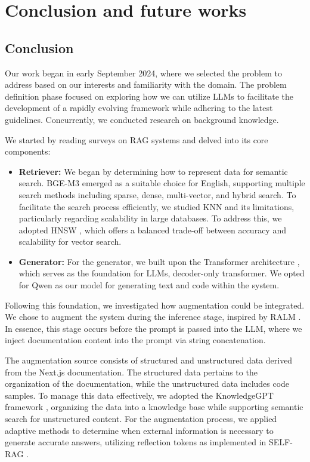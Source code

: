 \chapter{Conclusion and future works}

\section{Conclusion}

Our work began in early September 2024, where we selected the problem to address based on our interests and familiarity with the domain. The problem definition phase focused on exploring how we can utilize LLMs to facilitate the development of a rapidly evolving framework while adhering to the latest guidelines. Concurrently, we conducted research on background knowledge. 

We started by reading surveys on RAG systems \cite{zhao2024retrievalaugmentedgenerationaigeneratedcontent, gao2023ragllmsurvey} and delved into its core components:

\begin{itemize}
	\item \textbf{Retriever:} 
	We began by determining how to represent data for semantic search. BGE-M3 \cite{chen2024bge} emerged as a suitable choice for English, supporting multiple search methods including sparse, dense, multi-vector, and hybrid search. To facilitate the search process efficiently, we studied KNN and its limitations, particularly regarding scalability in large databases. To address this, we adopted HNSW \cite{malkov2018hnsw}, which offers a balanced trade-off between accuracy and scalability for vector search.
	
	\item \textbf{Generator:}
	For the generator, we built upon the Transformer architecture \cite{vaswani2017}, which serves as the foundation for LLMs, decoder-only transformer. We opted for Qwen \cite{bai2023qwen} as our model for generating text and code within the system.
\end{itemize}

Following this foundation, we investigated how augmentation could be integrated. We chose to augment the system during the inference stage, inspired by RALM \cite{ram2023incontext}. In essence, this stage occurs before the prompt is passed into the LLM, where we inject documentation content into the prompt via string concatenation. 

The augmentation source consists of structured and unstructured data derived from the Next.js documentation. The structured data pertains to the organization of the documentation, while the unstructured data includes code samples. To manage this data effectively, we adopted the KnowledgeGPT framework \cite{wang2023knowledgpt}, organizing the data into a knowledge base while supporting semantic search for unstructured content. For the augmentation process, we applied adaptive methods to determine when external information is necessary to generate accurate answers, utilizing reflection tokens as implemented in SELF-RAG \cite{asai2023selfrag}.


